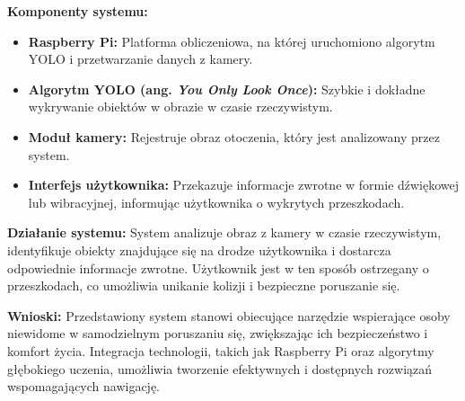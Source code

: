\documentclass[a4paper,twoside,12pt]{book}
\newtheorem{Definition}{Definicja}
\newtheorem{Example}{Przykład}
\newtheorem{Theorem}{Twierdzenie}
\begin{document}
\textbf{Komponenty systemu:}
\begin{itemize}
    \item \textbf{Raspberry Pi:} Platforma obliczeniowa, na której uruchomiono algorytm YOLO i przetwarzanie danych z kamery.
    \item \textbf{Algorytm YOLO (ang. \textit{You Only Look Once}):} Szybkie i dokładne wykrywanie obiektów w obrazie w czasie rzeczywistym.
    \item \textbf{Moduł kamery:} Rejestruje obraz otoczenia, który jest analizowany przez system.
    \item \textbf{Interfejs użytkownika:} Przekazuje informacje zwrotne w formie dźwiękowej lub wibracyjnej, informując użytkownika o wykrytych przeszkodach.
\end{itemize}

\textbf{Działanie systemu:}
System analizuje obraz z kamery w czasie rzeczywistym, identyfikuje obiekty znajdujące się na drodze użytkownika i dostarcza odpowiednie informacje zwrotne. Użytkownik jest w ten sposób ostrzegany o przeszkodach, co umożliwia unikanie kolizji i bezpieczne poruszanie się.

\textbf{Wnioski:}
Przedstawiony system stanowi obiecujące narzędzie wspierające osoby niewidome w samodzielnym poruszaniu się, zwiększając ich bezpieczeństwo i komfort życia. Integracja technologii, takich jak Raspberry Pi oraz algorytmy głębokiego uczenia, umożliwia tworzenie efektywnych i dostępnych rozwiązań wspomagających nawigację.

%
%
\end{document}
